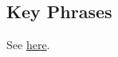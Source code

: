 	
		
		
	
		
		
	
		
		
\subsection{Key Phrases} %
	\label{INFINITE-PHRASES}

	\begin{compactdesc}
		\item[infinite atonement] See \hyperref[ATONEMENT-PHRASES]{here}.
	\end{compactdesc}
	
